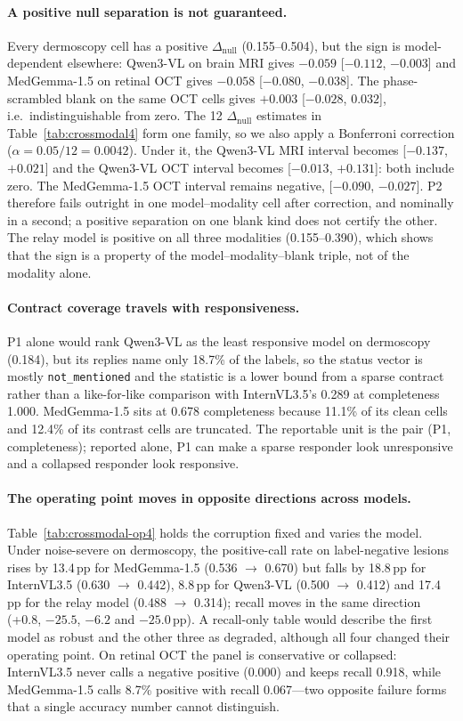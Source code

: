 \paragraph{A positive null separation is not guaranteed.} Every dermoscopy cell has a
positive $\Delta_{\text{null}}$ (0.155--0.504), but the sign is model-dependent elsewhere:
Qwen3-VL on brain MRI gives $-0.059$ [$-0.112$, $-0.003$] and MedGemma-1.5 on retinal OCT
gives $-0.058$ [$-0.080$, $-0.038$]. The phase-scrambled blank on the same OCT cells gives
$+0.003$ [$-0.028$, $0.032$], i.e.\ indistinguishable from zero. The 12 $\Delta_{\text{null}}$
estimates in Table~\ref{tab:crossmodal4} form one family, so we also apply a Bonferroni
correction ($\alpha=0.05/12=0.0042$). Under it, the Qwen3-VL MRI interval becomes
[$-0.137$, $+0.021$] and the Qwen3-VL OCT interval becomes [$-0.013$, $+0.131$]: both
include zero. The MedGemma-1.5 OCT interval remains negative, [$-0.090$, $-0.027$].
P2 therefore fails outright in one model--modality cell after correction, and nominally
in a second; a positive separation on one blank kind does not certify the other. The relay
model is positive on all three modalities (0.155--0.390), which shows that the sign is a
property of the model--modality--blank triple, not of the modality alone.

\paragraph{Contract coverage travels with responsiveness.} P1 alone would rank
Qwen3-VL as the least responsive model on dermoscopy (0.184), but its replies name only
18.7\% of the labels, so the status vector is mostly \texttt{not\_mentioned} and the
statistic is a lower bound from a sparse contract rather than a like-for-like comparison
with InternVL3.5's 0.289 at completeness 1.000. MedGemma-1.5 sits at 0.678 completeness
because 11.1\% of its clean cells and 12.4\% of its contrast cells are truncated. The
reportable unit is the pair (P1, completeness); reported alone, P1 can make a sparse
responder look unresponsive and a collapsed responder look responsive.

\paragraph{The operating point moves in opposite directions across models.}
Table~\ref{tab:crossmodal-op4} holds the corruption fixed and varies the model. Under
noise-severe on dermoscopy, the positive-call rate on label-negative lesions rises by
13.4\,pp for MedGemma-1.5 (0.536 $\rightarrow$ 0.670) but falls by 18.8\,pp for
InternVL3.5 (0.630 $\rightarrow$ 0.442), 8.8\,pp for Qwen3-VL (0.500 $\rightarrow$ 0.412)
and 17.4\,pp for the relay model (0.488 $\rightarrow$ 0.314); recall moves in the same
direction (+0.8, $-25.5$, $-6.2$ and $-25.0$\,pp). A recall-only table would describe the
first model as robust and the other three as degraded, although all four changed their
operating point. On retinal OCT the panel is conservative or collapsed: InternVL3.5 never
calls a negative positive (0.000) and keeps recall 0.918, while MedGemma-1.5 calls 8.7\%
positive with recall 0.067---two opposite failure forms that a single accuracy number
cannot distinguish.

